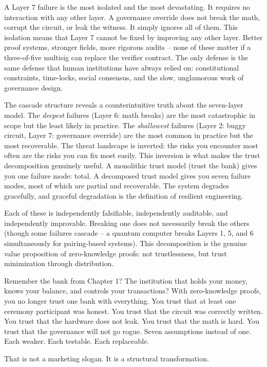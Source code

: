 \documentclass[
  11pt,
  openany]{report}
\begin{document}
A Layer 7 failure is the most isolated and the most devastating. It requires no
interaction with any other layer. A governance override does not break the math,
corrupt the circuit, or leak the witness. It simply ignores all of them. This
isolation means that Layer 7 cannot be fixed by improving any other layer.
Better proof systems, stronger fields, more rigorous audits -- none of these
matter if a three-of-five multisig can replace the verifier contract. The only
defense is the same defense that human institutions have always relied on:
constitutional constraints, time-locks, social consensus, and the slow,
unglamorous work of governance design.

The cascade structure reveals a counterintuitive truth about the seven-layer
model. The \emph{deepest} failures (Layer 6: math breaks) are the most
catastrophic in scope but the least likely in practice. The \emph{shallowest}
failures (Layer 2: buggy circuit, Layer 7: governance override) are the most
common in practice but the most recoverable. The threat landscape is inverted:
the risks you encounter most often are the risks you can fix most easily. This
inversion is what makes the trust decomposition genuinely useful. A monolithic
trust model (trust the bank) gives you one failure mode: total. A decomposed
trust model gives you seven failure modes, most of which are partial and
recoverable. The system degrades gracefully, and graceful degradation is the
definition of resilient engineering.

Each of these is independently falsifiable, independently auditable, and
independently improvable. Breaking one does not necessarily break the others
(though some failures cascade -- a quantum computer breaks Layers 1, 5, and 6
simultaneously for pairing-based systems). This decomposition is the genuine
value proposition of zero-knowledge proofs: not trustlessness, but trust
minimization through distribution.

Remember the bank from Chapter 1? The institution that holds your money, knows
your balance, and controls your transactions? With zero-knowledge proofs, you no
longer trust one bank with everything. You trust that at least one ceremony
participant was honest. You trust that the circuit was correctly written. You
trust that the hardware does not leak. You trust that the math is hard. You
trust that the governance will not go rogue. Seven assumptions instead of one.
Each weaker. Each testable. Each replaceable.

That is not a marketing slogan. It is a structural transformation.
\end{document}
